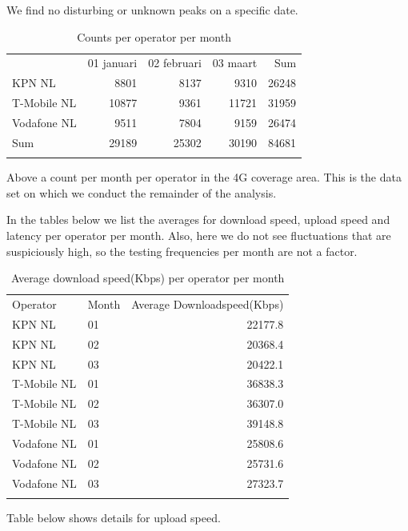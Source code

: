 \documentclass[]{article}
\begin{document}
We find no disturbing or unknown peaks on a specific date.

\begin{longtable}[c]{@{}lrrrr@{}}
\toprule\addlinespace
& 01 januari & 02 februari & 03 maart & Sum
\\\addlinespace
\midrule\endhead
KPN NL & 8801 & 8137 & 9310 & 26248
\\\addlinespace
T-Mobile NL & 10877 & 9361 & 11721 & 31959
\\\addlinespace
Vodafone NL & 9511 & 7804 & 9159 & 26474
\\\addlinespace
Sum & 29189 & 25302 & 30190 & 84681
\\\addlinespace
\bottomrule
\addlinespace
\caption{Counts per operator per month}
\end{longtable}

Above a count per month per operator in the 4G coverage area. This is
the data set on which we conduct the remainder of the analysis.

In the tables below we list the averages for download speed, upload
speed and latency per operator per month. Also, here we do not see
fluctuations that are suspiciously high, so the testing frequencies per
month are not a factor.

\begin{longtable}[c]{@{}llr@{}}
\toprule\addlinespace
Operator & Month & Average Downloadspeed(Kbps)
\\\addlinespace
\midrule\endhead
KPN NL & 01 & 22177.8
\\\addlinespace
KPN NL & 02 & 20368.4
\\\addlinespace
KPN NL & 03 & 20422.1
\\\addlinespace
T-Mobile NL & 01 & 36838.3
\\\addlinespace
T-Mobile NL & 02 & 36307.0
\\\addlinespace
T-Mobile NL & 03 & 39148.8
\\\addlinespace
Vodafone NL & 01 & 25808.6
\\\addlinespace
Vodafone NL & 02 & 25731.6
\\\addlinespace
Vodafone NL & 03 & 27323.7
\\\addlinespace
\bottomrule
\addlinespace
\caption{Average download speed(Kbps) per operator per month}
\end{longtable}

Table below shows details for upload speed.
\end{document}

